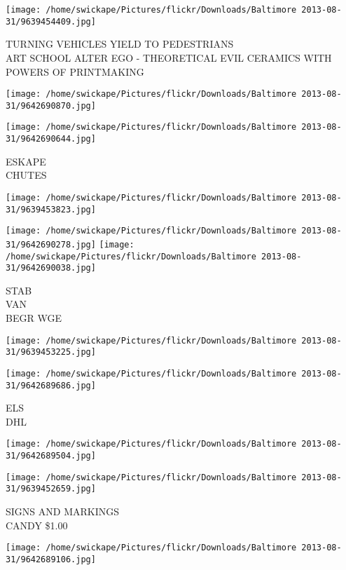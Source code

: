 \documentclass[10pt,letterpaper]{article}
\begin{document}
\vspace{0.25in}
\texttt{[image: /home/swickape/Pictures/flickr/Downloads/Baltimore 2013-08-31/9639454409.jpg]}

TURNING VEHICLES YIELD TO PEDESTRIANS\\
ART SCHOOL ALTER EGO {-} THEORETICAL EVIL CERAMICS WITH POWERS OF PRINTMAKING
\pagebreak

\texttt{[image: /home/swickape/Pictures/flickr/Downloads/Baltimore 2013-08-31/9642690870.jpg]}

\vspace{0.25in}
\texttt{[image: /home/swickape/Pictures/flickr/Downloads/Baltimore 2013-08-31/9642690644.jpg]}

ESKAPE\\
CHUTES
\pagebreak

\texttt{[image: /home/swickape/Pictures/flickr/Downloads/Baltimore 2013-08-31/9639453823.jpg]}

\vspace{0.25in}
\texttt{[image: /home/swickape/Pictures/flickr/Downloads/Baltimore 2013-08-31/9642690278.jpg]}
\texttt{[image: /home/swickape/Pictures/flickr/Downloads/Baltimore 2013-08-31/9642690038.jpg]}

STAB\\
VAN\\
BEGR WGE
\pagebreak

\texttt{[image: /home/swickape/Pictures/flickr/Downloads/Baltimore 2013-08-31/9639453225.jpg]}

\vspace{0.25in}
\texttt{[image: /home/swickape/Pictures/flickr/Downloads/Baltimore 2013-08-31/9642689686.jpg]}

ELS\\
DHL
\pagebreak

\texttt{[image: /home/swickape/Pictures/flickr/Downloads/Baltimore 2013-08-31/9642689504.jpg]}

\vspace{0.25in}
\texttt{[image: /home/swickape/Pictures/flickr/Downloads/Baltimore 2013-08-31/9639452659.jpg]}

SIGNS AND MARKINGS\\
CANDY \$1.00
\pagebreak

\texttt{[image: /home/swickape/Pictures/flickr/Downloads/Baltimore 2013-08-31/9642689106.jpg]}
\end{document}
